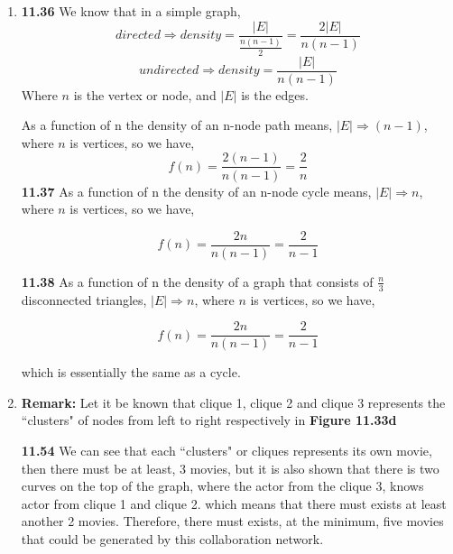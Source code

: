 \documentclass[12pt]{article}
\begin{document}
\begin{enumerate}[label=Part \Alph*)]
\begin{proof}[Proof]
		$(1, n + 1) \leftarrow (2, n + 1) \leftarrow \ldots \leftarrow (n + 1, n + 1)$
		
		
		By this visual, we can clearly see that whenever $r \in \mathbb{Z}_{\text{odd}}$, it will be making a downwards movement, so since $(n + 1) \in \mathbb{Z}_{\text{odd}}^{+}$, we know that $n \in \mathbb{Z}_{\text{even}}^{+}$, that means that it will be making an upwards movement so that it can turn right towards $(n + 1, 1)$ where it can start moving down again. Note that we have never really visited $c = n + 1$ for these traversal, so let it be known that, after reaching $(n + 1, n + 1)$, it can go directly to $(1, n+1)$, where the rook will be at the bottom-left of the chessboard.
        
        $\therefore$ By mathematical induction, and by \textbf{Case} $\boldsymbol{\alpha}$ and $\boldsymbol{\beta}$, it is true that the rook's tour exists for the $n \times n$ chessboard, for some $n \in \mathbb{Z}^{+}$.
        
    \end{proof}
    
    \item \textbf{11.36} We know that in a simple graph,
	$$directed \Rightarrow density = \frac{|E|}{\frac{n(n-1)}{2}} = \frac{2|E|}{n(n-1)}$$
	$$undirected \Rightarrow density =  \frac{|E|}{n(n-1)}$$
	Where $n$ is the vertex or node, and $|E|$ is the edges.
	
	As a function of n the density of an n-node path means, $|E| \Rightarrow (n - 1)$, where $n$ is vertices, so we have,
	$$f(n) = \frac{2(n-1)}{n(n-1)} = \frac{2}{n}$$
	\textbf{11.37} As a function of n the density of an n-node cycle means, $|E| \Rightarrow n$, where $n$ is vertices, so we have,
	
	$$f(n) = \frac{2n}{n(n-1)} = \frac{2}{n - 1}$$
	
	\textbf{11.38} As a function of n the density of a graph that consists of $\frac{n}{3}$ disconnected triangles, $|E| \Rightarrow n$, where $n$ is vertices, so we have,
	
	$$f(n) = \frac{2n}{n(n-1)} = \frac{2}{n - 1}$$
	
	which is essentially the same as a cycle.
		
	\item \textbf{Remark:} Let it be known that clique 1, clique 2 and clique 3 represents the ``clusters" of nodes from left to right respectively in \textbf{Figure 11.33d}
	
	\textbf{11.54} We can see that each ``clusters" or cliques represents its own movie, then there must be at least, 3 movies, but it is also shown that there is two curves on the top of the graph, where the actor from the clique 3, knows actor from clique 1 and clique 2. which means that there must exists at least another 2 movies. Therefore, there must exists, at the minimum, five movies that could be generated by this collaboration network.
	

\end{enumerate}
\end{document}
